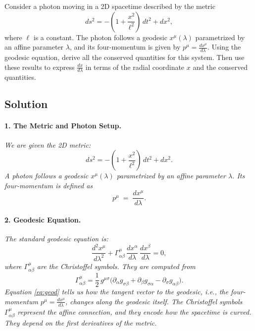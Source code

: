 Consider a photon moving in a 2D spacetime described by the metric
\begin{equation*}
ds^2 = -\left(1 + \frac{x^2}{\ell^2}\right)\,dt^2 + dx^2,
\end{equation*}
where \(\ell\) is a constant. The photon follows a geodesic \(x^\mu(\lambda)\) parametrized by an affine parameter \(\lambda\), and its four-momentum is given by \(p^\mu = \frac{dx^\mu}{d\lambda}\). Using the geodesic equation, derive all the conserved quantities for this system. Then use these results to express \(\frac{dx}{d\lambda}\) in terms of the radial coordinate \(x\) and the conserved quantities.

\subsection*{Solution}

\paragraph{1. The Metric and Photon Setup.}

\textit{We are given the 2D metric:}
\begin{equation*}
ds^2
= -\left(1 + \frac{x^2}{\ell^2}\right)\,dt^2
+ dx^2.
\end{equation*}
\textit{A photon follows a geodesic \(x^\mu(\lambda)\) parametrized by an affine parameter \(\lambda\). Its four-momentum is defined as}
\[
p^\mu \;=\; \frac{dx^\mu}{d\lambda}.
\]

\paragraph{2. Geodesic Equation.}

\textit{The standard geodesic equation is:}
\begin{equation*}\label{eq:geod}
\frac{d^2 x^\mu}{d\lambda^2}
+ \Gamma^\mu_{\alpha\beta}\,\frac{dx^\alpha}{d\lambda}\,\frac{dx^\beta}{d\lambda}
= 0,
\end{equation*}
\textit{where \(\Gamma^\mu_{\alpha\beta}\) are the Christoffel symbols. They are computed from}
\begin{equation*}\label{eq:christoffel}
\Gamma^\mu_{\alpha\beta}
= \frac{1}{2}\,g^{\mu\sigma}
\bigl(\partial_\alpha g_{\sigma\beta}
+ \partial_\beta g_{\sigma\alpha}
- \partial_\sigma g_{\alpha\beta}\bigr).
\end{equation*}
\textit{Equation \eqref{eq:geod} tells us how the tangent vector to the geodesic, i.e., the four-momentum \(p^\mu = \frac{dx^\mu}{d\lambda}\), changes along the geodesic itself. The Christoffel symbols \(\Gamma^\mu_{\alpha\beta}\) represent the affine connection, and they encode how the spacetime is curved. They depend on the first derivatives of the metric.}

